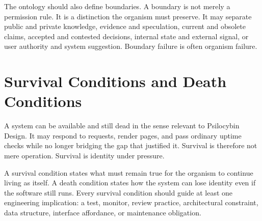 \documentclass[11pt]{article}
\begin{document}
The ontology should also define boundaries. A boundary is not merely a permission rule. It is a distinction the organism must preserve. It may separate public and private knowledge, evidence and speculation, current and obsolete claims, accepted and contested decisions, internal state and external signal, or user authority and system suggestion. Boundary failure is often organism failure.

\section{Survival Conditions and Death Conditions}

A system can be available and still dead in the sense relevant to Psilocybin Design. It may respond to requests, render pages, and pass ordinary uptime checks while no longer bridging the gap that justified it. Survival is therefore not mere operation. Survival is identity under pressure.

A survival condition states what must remain true for the organism to continue living as itself. A death condition states how the system can lose identity even if the software still runs. Every survival condition should guide at least one engineering implication: a test, monitor, review practice, architectural constraint, data structure, interface affordance, or maintenance obligation.
\end{document}
